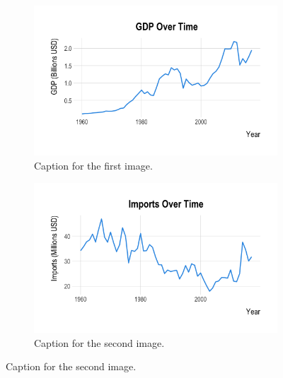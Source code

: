 \documentclass[11pt]{article}
\begin{document}
\begin{figure}[htbp]
  \centering
  \begin{subfigure}[b]{0.48\textwidth}
    \centering
    \includegraphics[width=\linewidth]{EDA/GDP_over_Time.png} %
    \caption{Caption for the first image.}
    \label{fig:side:a}
  \end{subfigure}
  \hfill
  \begin{subfigure}[b]{0.48\textwidth}
    \centering
    \includegraphics[width=\linewidth]{EDA/Imports_over_Time.png} %
    \caption{Caption for the second image.}
    \label{fig:side:b}
  \end{subfigure}

  \label{fig:side-by-side}


\end{figure}
\end{document}
